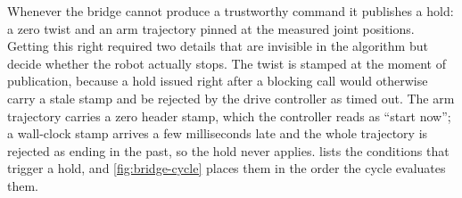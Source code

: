 Whenever the bridge cannot produce a trustworthy command it publishes a
hold: a zero twist and an arm trajectory pinned at the measured joint
positions. Getting this right required two details that are invisible in
the algorithm but decide whether the robot actually stops. The twist is
stamped at the moment of publication, because a hold issued right after
a blocking call would otherwise carry a stale stamp and be rejected by
the drive controller as timed out. The arm trajectory carries a zero
header stamp, which the controller reads as ``start now''; a wall-clock
stamp arrives a few milliseconds late and the whole trajectory is
rejected as ending in the past, so the hold never applies.
 lists the conditions that trigger a hold, and
\cref{fig:bridge-cycle} places them in the order the cycle evaluates
them.

